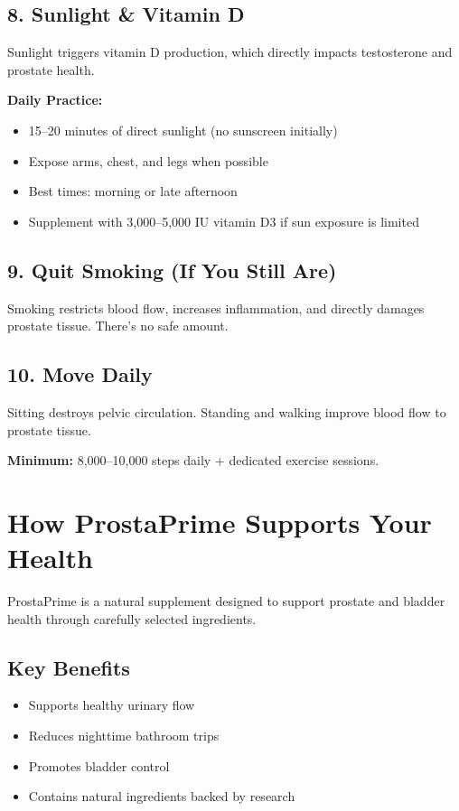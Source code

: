 \documentclass[11pt,oneside,openany]{book}
\begin{document}
\section*{8. Sunlight \& Vitamin D}
Sunlight triggers vitamin D production, which directly impacts testosterone and prostate health.

\textbf{Daily Practice:}
\begin{itemize}[leftmargin=*]
\item 15--20 minutes of direct sunlight (no sunscreen initially)
\item Expose arms, chest, and legs when possible
\item Best times: morning or late afternoon
\item Supplement with 3,000--5,000 IU vitamin D3 if sun exposure is limited
\end{itemize}

\section*{9. Quit Smoking (If You Still Are)}
Smoking restricts blood flow, increases inflammation, and directly damages prostate tissue. There's no safe amount.

\section*{10. Move Daily}
Sitting destroys pelvic circulation. Standing and walking improve blood flow to prostate tissue.

\textbf{Minimum:} 8,000--10,000 steps daily + dedicated exercise sessions.


\chapter*{How ProstaPrime Supports Your Health}

ProstaPrime is a natural supplement designed to support prostate and bladder health through carefully selected ingredients.

\section*{Key Benefits}
\begin{itemize}[leftmargin=*]
\item Supports healthy urinary flow
\item Reduces nighttime bathroom trips
\item Promotes bladder control
\item Contains natural ingredients backed by research
\end{itemize}
\end{document}
